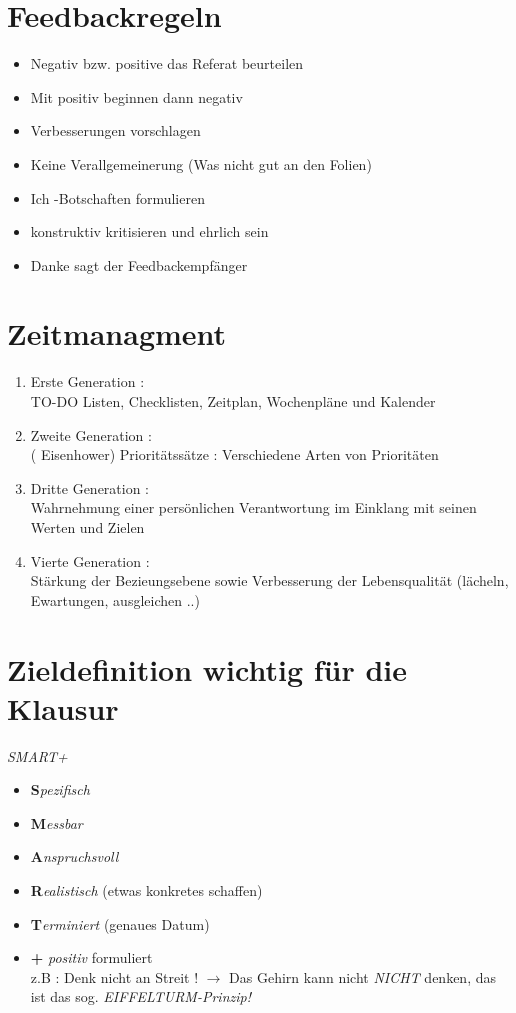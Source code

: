 \documentclass[11pt,a4paper]{article}
\begin{document}
\section*{Feedbackregeln}
\begin{itemize}
\item Negativ bzw. positive das Referat beurteilen
\item Mit positiv beginnen dann negativ
\item Verbesserungen vorschlagen
\item Keine Verallgemeinerung (Was nicht gut an den Folien)
\item Ich -Botschaften formulieren 
\item konstruktiv kritisieren und ehrlich sein
\item Danke sagt der Feedbackempfänger
\end{itemize}

\section*{Zeitmanagment}
\begin{enumerate}
\item Erste Generation : \\ TO-DO Listen, Checklisten, Zeitplan, Wochenpläne und Kalender
\item Zweite Generation : \\ ( Eisenhower) Prioritätssätze : Verschiedene Arten von Prioritäten 
\item Dritte Generation : \\ Wahrnehmung einer persönlichen Verantwortung im Einklang mit seinen Werten und Zielen
\item Vierte Generation : \\ Stärkung der Bezieungsebene sowie Verbesserung der Lebensqualität (lächeln, Ewartungen, ausgleichen ..)
\end{enumerate}

\section*{Zieldefinition \tiny{wichtig für die Klausur} } 
\textit{SMART+}
\begin{itemize}
\item \textbf{S}\textit{pezifisch}
\item \textbf{M}\textit{essbar}
\item \textbf{A}\textit{nspruchsvoll}
\item \textbf{R}\textit{ealistisch} (etwas konkretes schaffen)
\item \textbf{T}\textit{erminiert} (genaues Datum)
\item \textbf{+} \textit{positiv} formuliert \\ z.B : Denk nicht an Streit ! $\rightarrow$ Das Gehirn kann nicht \emph{NICHT} denken, das ist das sog. \emph{EIFFELTURM-Prinzip!}
\end{itemize}
\end{document}

